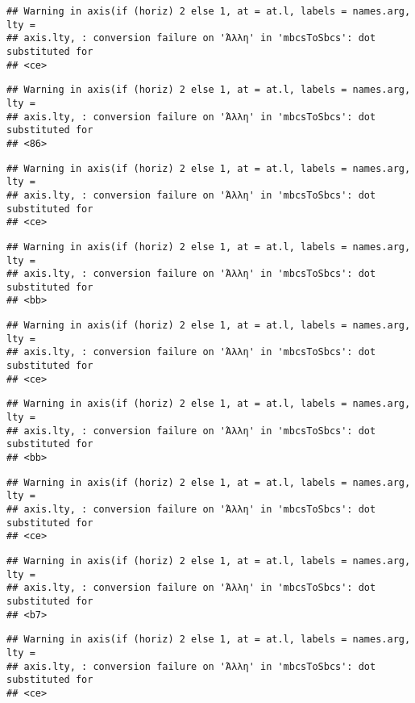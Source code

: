 \documentclass[
]{article}
\begin{document}
\begin{verbatim}
## Warning in axis(if (horiz) 2 else 1, at = at.l, labels = names.arg, lty =
## axis.lty, : conversion failure on 'Άλλη' in 'mbcsToSbcs': dot substituted for
## <ce>
\end{verbatim}

\begin{verbatim}
## Warning in axis(if (horiz) 2 else 1, at = at.l, labels = names.arg, lty =
## axis.lty, : conversion failure on 'Άλλη' in 'mbcsToSbcs': dot substituted for
## <86>
\end{verbatim}

\begin{verbatim}
## Warning in axis(if (horiz) 2 else 1, at = at.l, labels = names.arg, lty =
## axis.lty, : conversion failure on 'Άλλη' in 'mbcsToSbcs': dot substituted for
## <ce>
\end{verbatim}

\begin{verbatim}
## Warning in axis(if (horiz) 2 else 1, at = at.l, labels = names.arg, lty =
## axis.lty, : conversion failure on 'Άλλη' in 'mbcsToSbcs': dot substituted for
## <bb>
\end{verbatim}

\begin{verbatim}
## Warning in axis(if (horiz) 2 else 1, at = at.l, labels = names.arg, lty =
## axis.lty, : conversion failure on 'Άλλη' in 'mbcsToSbcs': dot substituted for
## <ce>
\end{verbatim}

\begin{verbatim}
## Warning in axis(if (horiz) 2 else 1, at = at.l, labels = names.arg, lty =
## axis.lty, : conversion failure on 'Άλλη' in 'mbcsToSbcs': dot substituted for
## <bb>
\end{verbatim}

\begin{verbatim}
## Warning in axis(if (horiz) 2 else 1, at = at.l, labels = names.arg, lty =
## axis.lty, : conversion failure on 'Άλλη' in 'mbcsToSbcs': dot substituted for
## <ce>
\end{verbatim}

\begin{verbatim}
## Warning in axis(if (horiz) 2 else 1, at = at.l, labels = names.arg, lty =
## axis.lty, : conversion failure on 'Άλλη' in 'mbcsToSbcs': dot substituted for
## <b7>
\end{verbatim}

\begin{verbatim}
## Warning in axis(if (horiz) 2 else 1, at = at.l, labels = names.arg, lty =
## axis.lty, : conversion failure on 'Άλλη' in 'mbcsToSbcs': dot substituted for
## <ce>
\end{verbatim}
\end{document}

